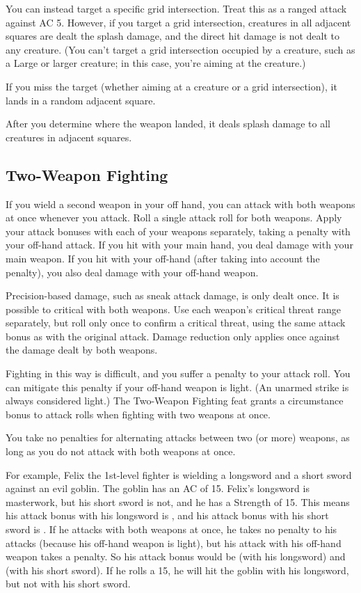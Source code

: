 You can instead target a specific grid intersection. Treat this as a ranged attack against AC 5. However, if you target a grid intersection, creatures in all adjacent squares are dealt the splash damage, and the direct hit damage is not dealt to any creature. (You can't target a grid intersection occupied by a creature, such as a Large or larger creature; in this case, you're aiming at the creature.)

If you miss the target (whether aiming at a creature or a grid intersection), it lands in a random adjacent square.

After you determine where the weapon landed, it deals splash damage to all creatures in adjacent squares.

\subsection{Two-Weapon Fighting}
If you wield a second weapon in your off hand, you can attack with both weapons at once whenever you attack. Roll a single attack roll for both weapons. Apply your attack bonuses with each of your weapons separately, taking a  penalty with your off-hand attack. If you hit with your main hand, you deal damage with your main weapon. If you hit with your off-hand (after taking into account the  penalty), you also deal damage with your off-hand weapon.

\par Precision-based damage, such as sneak attack damage, is only dealt once. It is possible to critical with both weapons. Use each weapon's critical threat range separately, but roll only once to confirm a critical threat, using the same attack bonus as with the original attack. Damage reduction only applies once against the damage dealt by both weapons.

\par Fighting in this way is difficult, and you suffer a  penalty to your attack roll. You can mitigate this penalty if your off-hand weapon is light. (An unarmed strike is always considered light.) The Two-Weapon Fighting feat grants a  circumstance bonus to attack rolls when fighting with two weapons at once.

You take no penalties for alternating attacks between two (or more) weapons, as long as you do not attack with both weapons at once.

\par For example, Felix the 1st-level fighter is wielding a longsword and a short sword against an evil goblin. The goblin has an AC of 15. Felix's longsword is masterwork, but his short sword is not, and he has a Strength of 15. This means his attack bonus with his longsword is , and his attack bonus with his short sword is . If he attacks with both weapons at once, he takes no penalty to his attacks (because his off-hand weapon is light), but his attack with his off-hand weapon takes a  penalty. So his attack bonus would be  (with his longsword) and  (with his short sword). If he rolls a 15, he will hit the goblin with his longsword, but not with his short sword.

